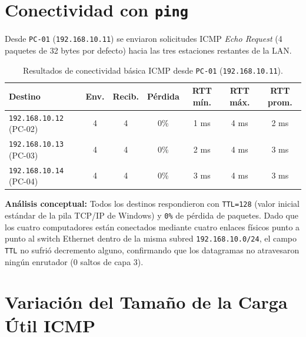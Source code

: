 \documentclass[11pt, a4paper]{article}
\begin{document}
\section{Conectividad con \texttt{ping}}

Desde \texttt{PC-01} (\texttt{192.168.10.11}) se enviaron solicitudes ICMP \textit{Echo Request} (4 paquetes de 32 bytes por defecto) hacia las tres estaciones restantes de la LAN.

\begin{table}[h!]
\centering
\small
\setlength{\tabcolsep}{4pt}
\caption{Resultados de conectividad básica ICMP desde \texttt{PC-01} (\texttt{192.168.10.11}).}
\begin{tabularx}{\textwidth}{>{\raggedright\arraybackslash}X c c c c c c}
\toprule
\textbf{Destino} & \textbf{Env.} & \textbf{Recib.} & \textbf{Pérdida} & \textbf{RTT mín.} & \textbf{RTT máx.} & \textbf{RTT prom.} \\
\midrule
\texttt{192.168.10.12} (PC-02) & 4 & 4 & 0\% & 1 ms & 4 ms & 2 ms \\
\texttt{192.168.10.13} (PC-03) & 4 & 4 & 0\% & 2 ms & 4 ms & 3 ms \\
\texttt{192.168.10.14} (PC-04) & 4 & 4 & 0\% & 3 ms & 4 ms & 3 ms \\
\bottomrule
\end{tabularx}
\end{table}

\noindent \textbf{Análisis conceptual:} Todos los destinos respondieron con \texttt{TTL=128} (valor inicial estándar de la pila TCP/IP de Windows) y \texttt{0\%} de pérdida de paquetes. Dado que los cuatro computadores están conectados mediante cuatro enlaces físicos punto a punto al switch Ethernet dentro de la misma subred \texttt{192.168.10.0/24}, el campo \texttt{TTL} no sufrió decremento alguno, confirmando que los datagramas no atravesaron ningún enrutador (0 saltos de capa 3).

\section{Variación del Tamaño de la Carga Útil ICMP}
\end{document}
